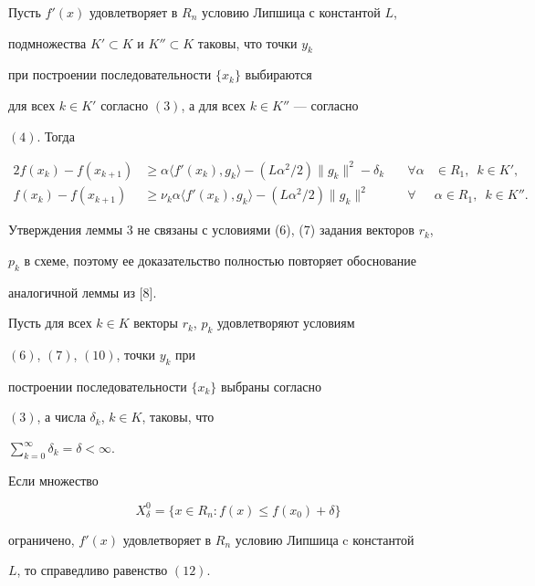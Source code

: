 \begin{lem}


Пусть ${f}'(x)$ удовлетворяет в $R_n$ условию Липшица с константой $L$,


подмножества ${K}'\subset K$ и ${K}''\subset K$ таковы, что точки $y_k$


при построении последовательности $\{{x_k} \}$ выбираются


для всех $k\in {K}'$ согласно $(3)$, а для всех $k\in {K}''$ --- согласно


$(4)$. Тогда


\begin{alignat}{2}


f(x_k)-f(x_{k+1})&\ge \alpha \langle {{f}'(x_k),g_k} \rangle -


(L\alpha^2/2) \|{g_k} \|^2-\delta_k&\quad \forall \alpha &\in R_1,


\ \; k\in {K}', \\


%


f(x_k)-f(x_{k+1})&\ge \nu_k \alpha \langle {{f}'(x_k),g_k} \rangle -


(L\alpha^2/2) \|{g_k} \|^2 &\quad \forall &\alpha \in R_1,


\ \; k\in {K}''.


\end{alignat}


\end{lem}





Утверждения леммы 3 не связаны с условиями (6), (7) задания векторов $r_k$,


$p_k$ в схеме, поэтому ее доказательство полностью повторяет обоснование


аналогичной леммы из [8].





\begin{thm}


Пусть для всех $k\in K$ векторы $r_k$, $p_k$ удовлетворяют условиям


$(6)$, $(7)$, $(10)$, точки $y_k$ при


построении последовательности $\{{x_k} \}$ выбраны согласно


$(3)$, а числа $\delta_k$, $k\in K$, таковы, что


$\sum\limits_{k=0}^{\infty}\delta_k=\delta <\infty$.


Если множество


$$


X^{0}_{\delta}= \{{x\in R_n: f(x)\le f(x_0)+\delta} \}


$$


ограничено, ${f}'(x)$ удовлетворяет в $R_n$ условию Липшица c константой


$L$, то справедливо равенство $(12)$.


\end{thm}






